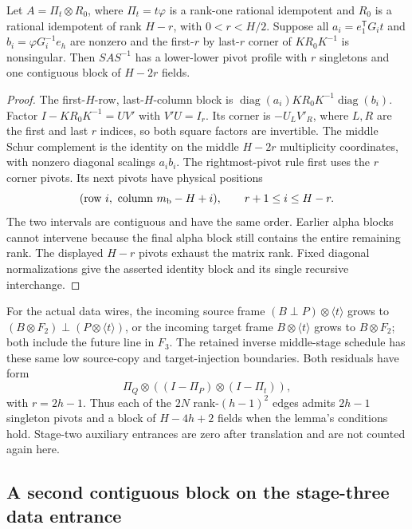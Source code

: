 \begin{lemma}
\label{lem:nested-data-entrance-pivots}
Let $A=\Pi_t\otimes R_0$, where $\Pi_t=t\varphi$ is a rank-one rational
idempotent and $R_0$ is a rational idempotent of rank $H-r$, with
$0<r<H/2$. Suppose all $a_i=e_1^{\mathsf T}G_it$ and
$b_i=\varphi G_i^{-1}e_h$ are nonzero and the first-$r$ by last-$r$ corner
of $KR_0K^{-1}$ is nonsingular. Then $SAS^{-1}$ has a lower-lower pivot
profile with $r$ singletons and one contiguous block of $H-2r$ fields.
\end{lemma}
\begin{proof}
The first-$H$-row, last-$H$-column block is
$\operatorname{diag}(a_i)KR_0K^{-1}\operatorname{diag}(b_i)$.
Factor $I-KR_0K^{-1}=UV'$ with $V'U=I_r$. Its corner is $-U_LV'_{R}$,
where $L,R$ are the first and last $r$ indices, so both square factors are
invertible. The middle Schur complement is the identity on the middle
$H-2r$ multiplicity coordinates, with nonzero diagonal scalings $a_ib_i$.
The rightmost-pivot rule first uses the $r$ corner pivots. Its next pivots
have physical positions
\[
 (\text{row }i,\ \text{column }m_{\rm b}-H+i),
 \qquad r+1\le i\le H-r.
\]
The two intervals are contiguous and have the same order. Earlier alpha
blocks cannot intervene because the final alpha block still contains the
entire remaining rank. The displayed $H-r$ pivots exhaust the matrix rank.
Fixed diagonal normalizations give the asserted identity block and its
single recursive interchange.
\end{proof}

For the actual data wires, the incoming source frame
$(B\perp P)\otimes\langle t\rangle$ grows to
$(B\otimes F_2)\perp(P\otimes\langle t\rangle)$, or the incoming target
frame $B\otimes\langle t\rangle$ grows to $B\otimes F_2$; both include the
future line in $F_3$. The retained inverse middle-stage schedule has these
same low source-copy and target-injection boundaries. Both residuals have
form
\[
 \Pi_Q\otimes((I-\Pi_P)\otimes(I-\Pi_t)),
\]
with $r=2h-1$. Thus each of the $2N$ rank-$(h-1)^2$ edges admits
$2h-1$ singleton pivots and a block of $H-4h+2$ fields when the lemma's
conditions hold. Stage-two auxiliary entrances are zero after translation
and are not counted again here.

\subsection{A second contiguous block on the stage-three data entrance}
\label{sec:nested-a3-corner}

